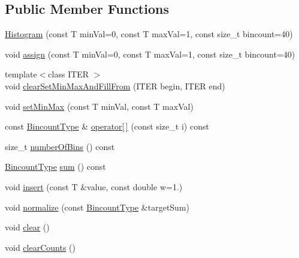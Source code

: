 \subsection*{Public Member Functions}
\begin{DoxyCompactItemize}
\item 
\hyperlink{classnifty_1_1histogram_1_1Histogram_ad7b503ee095f0bbe52f473f7bd8b6d63}{Histogram} (const T min\+Val=0, const T max\+Val=1, const size\+\_\+t bincount=40)
\item 
void \hyperlink{classnifty_1_1histogram_1_1Histogram_a5ced1f86011745189e73d686f65aad0a}{assign} (const T min\+Val=0, const T max\+Val=1, const size\+\_\+t bincount=40)
\item 
{\footnotesize template$<$class I\+T\+ER $>$ }\\void \hyperlink{classnifty_1_1histogram_1_1Histogram_a6dc9984784d563f8201c95a2c95bbc45}{clear\+Set\+Min\+Max\+And\+Fill\+From} (I\+T\+ER begin, I\+T\+ER end)
\item 
void \hyperlink{classnifty_1_1histogram_1_1Histogram_ac4790791017587f3ec614c00abd6c68f}{set\+Min\+Max} (const T min\+Val, const T max\+Val)
\item 
const \hyperlink{classnifty_1_1histogram_1_1Histogram_a19ad5e06bce1f70819a7ac9cdb708cf3}{Bincount\+Type} \& \hyperlink{classnifty_1_1histogram_1_1Histogram_a262b175b7093919f1ca5817679237091}{operator\mbox{[}$\,$\mbox{]}} (const size\+\_\+t i) const
\item 
size\+\_\+t \hyperlink{classnifty_1_1histogram_1_1Histogram_a81f5001934bce97d1b852bda5d4daf99}{number\+Of\+Bins} () const
\item 
\hyperlink{classnifty_1_1histogram_1_1Histogram_a19ad5e06bce1f70819a7ac9cdb708cf3}{Bincount\+Type} \hyperlink{classnifty_1_1histogram_1_1Histogram_a22a3d01d66aff92a661228846f9f726e}{sum} () const
\item 
void \hyperlink{classnifty_1_1histogram_1_1Histogram_a4b344ea118713a965a4a3e6f3936cb20}{insert} (const T \&value, const double w=1.)
\item 
void \hyperlink{classnifty_1_1histogram_1_1Histogram_ac4ff991c8e2418d66643052ff69e4afa}{normalize} (const \hyperlink{classnifty_1_1histogram_1_1Histogram_a19ad5e06bce1f70819a7ac9cdb708cf3}{Bincount\+Type} \&target\+Sum)
\item 
void \hyperlink{classnifty_1_1histogram_1_1Histogram_a6b8a4dfdc710c8c56b3afebe3990dd33}{clear} ()
\item 
void \hyperlink{classnifty_1_1histogram_1_1Histogram_ac6771f36d3c23a030650e55ff5bda1bf}{clear\+Counts} ()

\end{DoxyCompactItemize}

